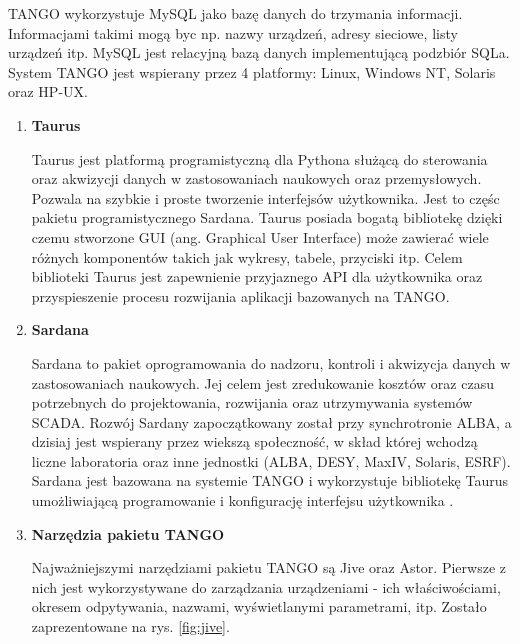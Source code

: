 \begin{enumerate}
	\hspace{2em}TANGO wykorzystuje MySQL jako bazę danych do trzymania informacji. Informacjami takimi mogą byc np. nazwy urządzeń, adresy sieciowe, listy urządzeń itp. MySQL jest relacyjną bazą danych implementującą podzbiór SQLa. System TANGO jest wspierany przez 4 platformy: Linux, Windows NT, Solaris oraz HP-UX.
	
	\begin{enumerate}
		\item \textbf{Taurus}
		
		\hspace{2em}Taurus jest platformą programistyczną dla Pythona służącą do sterowania oraz akwizycji danych w zastosowaniach naukowych oraz przemysłowych. Pozwala na szybkie i proste tworzenie interfejsów użytkownika. Jest to częśc pakietu programistycznego Sardana. Taurus posiada bogatą bibliotekę dzięki czemu stworzone GUI (ang. Graphical User Interface)  może zawierać wiele różnych komponentów takich jak wykresy, tabele, przyciski itp. Celem biblioteki Taurus jest zapewnienie przyjaznego API dla użytkownika oraz przyspieszenie procesu rozwijania aplikacji bazowanych na TANGO.
				
		
		\item \textbf{Sardana}
		
		\hspace{2em}Sardana to pakiet oprogramowania do nadzoru, kontroli i akwizycja danych w zastosowaniach naukowych. Jej celem jest zredukowanie kosztów oraz czasu potrzebnych do projektowania, rozwijania oraz utrzymywania systemów SCADA. Rozwój Sardany zapoczątkowany został przy synchrotronie ALBA, a dzisiaj jest wspierany przez wiekszą społeczność,  w skład której wchodzą liczne laboratoria oraz inne jednostki (ALBA, DESY, MaxIV, Solaris, ESRF).
		Sardana jest bazowana na systemie TANGO i wykorzystuje bibliotekę Taurus umożliwiającą programowanie i konfigurację interfejsu użytkownika \cite{Sardana}.
		
		\item \textbf{Narzędzia pakietu TANGO}
		
		\hspace{2em}Najważniejszymi narzędziami pakietu TANGO są Jive oraz Astor. Pierwsze z nich jest wykorzystywane do zarządzania urządzeniami - ich właściwościami, okresem odpytywania, nazwami, wyświetlanymi parametrami, itp. Zostało zaprezentowane na rys. \ref{fig:jive}.
		

\end{enumerate}
\end{enumerate}
